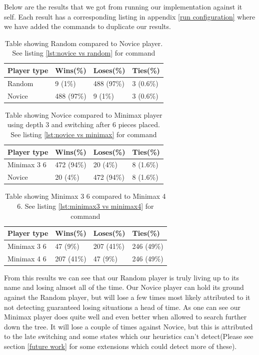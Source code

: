 Below are the results that we got from running our implementation against it self.
Each result has a corresponding listing in appendix \ref{run configuration} where
we have added the commands to duplicate our results.

\begin{table}[btp]
	\centering
	\begin{tabular}{| l | l | l | l |}
		\hline
		Player type & Wins(\%) & Loses(\%) & Ties(\%)\\
		\hline
		Random & 9 (1\%) & 488 (97\%) & 3 (0.6\%)\\
		Novice & 488 (97\%) & 9 (1\%) & 3 (0.6\%)\\
		\hline
	\end{tabular}
	\caption{Table showing Random compared to Novice player. See listing
	\ref{lst:novice vs random} for command}
	\label{table:random vs novice}
\end{table}
\begin{table}[btp]
	\centering
	\begin{tabular}{| l | l | l | l |}
		\hline
		Player type & Wins(\%) & Loses(\%) & Ties(\%)\\
		\hline
		Minimax 3 6 & 472 (94\%) & 20 (4\%) & 8 (1.6\%)\\
		Novice & 20 (4\%) & 472 (94\%) & 8 (1.6\%)\\
		\hline
	\end{tabular}
	\caption{Table showing Novice compared to Minimax player using depth 3
	and switching after 6 pieces placed. See listing \ref{lst:novice vs minimax}
for command}
	\label{table:minimax vs novice}
\end{table}

\begin{table}[btp]
	\centering
	\begin{tabular}{| l | l | l | l |}
		\hline
		Player type & Wins(\%) & Loses(\%) & Ties(\%)\\
		\hline
		Minimax 3 6 & 47 (9\%) & 207 (41\%) & 246 (49\%)\\
		Minimax 4 6 & 207 (41\%) & 47 (9\%) & 246 (49\%)\\
		\hline
	\end{tabular}
	\caption{Table showing Minimax 3 6 compared to Minimax 4 6. See listing
	\ref{lst:minimax3 vs minimax4} for command}
	\label{table:minimax3 vs minimax 4}
\end{table}

From this results we can see that our Random player is truly living up to its
name and losing almost all of the time. Our Novice player can hold its ground
against the Random player, but will lose a few times most likely attributed to
it not detecting guaranteed losing situations a head of time. As one can see our
Minimax player does quite well and even better when allowed to search further
down the tree. It will lose a couple of times against Novice, but this is attributed
to the late switching and some states which our heuristics can't detect(Please see
section \ref{future work} for some extensions which could detect more of these).

